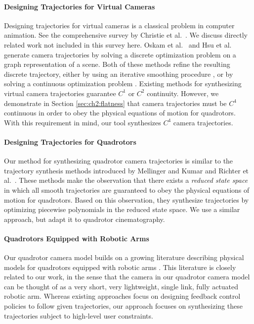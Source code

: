 \paragraph{Designing Trajectories for Virtual Cameras}
Designing trajectories for virtual cameras is a classical problem in computer animation.
See the comprehensive survey by Christie et al.~.
We discuss directly related work not included in this survey here.
Oskam et al.~ and Hsu et al.~ generate camera trajectories by solving a discrete optimization problem on a graph representation of a scene.
Both of these methods refine the resulting  discrete trajectory, either by using an iterative smoothing procedure \cite{oskam:2009}, or by solving a continuous optimization problem \cite{hsu:2013}.
Existing methods for synthesizing virtual camera trajectories guarantee $C^1$ or $C^2$ continuity.
However, we demonstrate in Section \ref{sec:ch2:flatness} that camera trajectories must be $C^4$ continuous in order to obey the physical equations of motion for quadrotors.
With this requirement in mind, our tool synthesizes $C^4$ camera trajectories.

\paragraph{Designing Trajectories for Quadrotors}
Our method for synthesizing quadrotor camera trajectories is similar to the trajectory synthesis methods introduced by Mellinger and Kumar  and Richter et al.~.
These methods make the observation that there exists a \emph{reduced state space} in which all smooth trajectories are guaranteed to obey the physical equations of motion for quadrotors.
Based on this observation, they synthesize trajectories by optimizing piecewise polynomials in the reduced state space.
We use a similar approach, but adapt it to quadrotor cinematography.

\paragraph{Quadrotors Equipped with Robotic Arms}
Our quadrotor camera model builds on a growing literature describing physical models for quadrotors equipped with robotic arms \cite{kim:2013,lipiello:2012,ruggiero:2015,yang:2014}.
This literature is closely related to our work, in the sense that the camera in our quadrotor camera model can be thought of as a very short, very lightweight, single link, fully actuated robotic arm.
Whereas existing approaches focus on designing feedback control policies to follow given trajectories, our approach focuses on synthesizing these trajectories subject to high-level user constraints.

